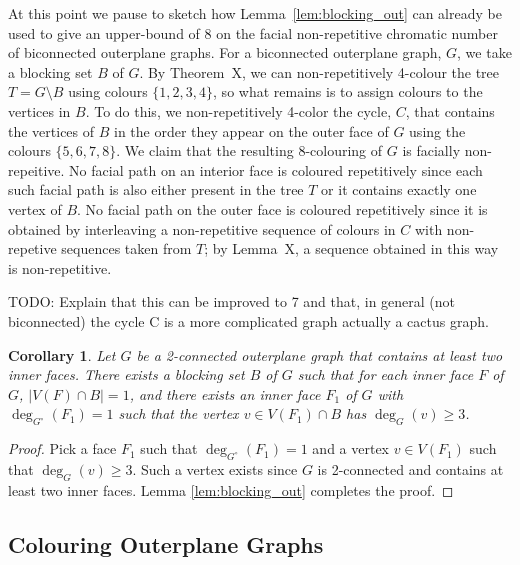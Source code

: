 \documentclass{patmorin}
\newcommand{\wdual}[1]{#1^{\circ}}
\newtheorem{corollary}[theorem]{Corollary}
\begin{document}
At this point we pause to sketch how Lemma~\ref{lem:blocking_out}
can already be used to give an upper-bound of 8 on the facial
non-repetitive chromatic number of biconnected outerplane graphs.
For a biconnected outerplane graph, $G$, we take a blocking set $B$
of $G$.  By Theorem~X, we can non-repetitively 4-colour the tree
$T=G\setminus B$ using colours $\{1,2,3,4\}$, so what remains is to assign
colours to the vertices in $B$.  To do this, we non-repetitively 4-color
the cycle, $C$, that contains the vertices of $B$ in the order they appear on
the outer face of $G$ using the colours $\{5,6,7,8\}$.  We claim that
the resulting 8-colouring of $G$ is facially non-repeitive.  No facial
path on an interior face is coloured repetitively since each such facial path
is also either present in the tree $T$ or it contains exactly one
vertex of $B$.  No facial path on the outer face is coloured repetitively
since it is obtained by interleaving a non-repetitive sequence of colours in $C$ with non-repetive sequences taken from $T$; by Lemma~X, a sequence obtained in this way is non-repetitive.

TODO: Explain that this can be improved to 7 and that, in general (not
biconnected)
 the cycle C is a more complicated graph
 actually a cactus
graph.
 

 

\begin{corollary}
 Let $G$ be a 2-connected outerplane graph that contains at least two inner faces. There exists a blocking set $B$ of $G$ such that for each inner face $F$ of $G$, $|V(F) \cap B|=1$, and there exists an inner face $F_1$ of $G$ with $\deg_{\wdual{G}}(F_1)=1$ such that the vertex $v \in V(F_1) \cap B$ has $\deg_G(v) \geq 3$.
  \label{cor:blocking_out_select}
\end{corollary}

\begin{proof}
  Pick a face $F_1$ such that $\deg_{\wdual{G}}(F_1)=1$ and a vertex $v \in V(F_1)$ such that $\deg_G(v) \geq 3$. Such a vertex exists since $G$ is 2-connected and contains at least two inner faces. Lemma \ref{lem:blocking_out} completes the proof. 
\end{proof}

\subsection{Colouring Outerplane Graphs}
\end{document}
